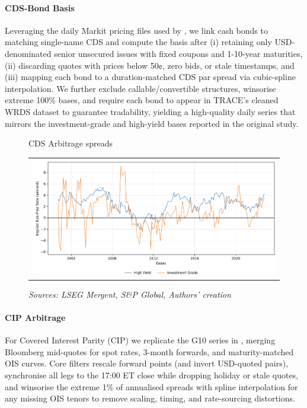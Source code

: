 \documentclass{article}
\begin{document}
\paragraph{CDS-Bond Basis}
Leveraging the daily Markit pricing files used by \citet{Siriwardane2021}, we link cash bonds to matching single-name CDS and compute the basis after (i) retaining only USD-denominated senior unsecured issues with fixed coupons and 1-10-year maturities, (ii) discarding quotes with prices below 50¢, zero bids, or stale timestamps, and (iii) mapping each bond to a duration-matched CDS par spread via cubic-spline interpolation.  We further exclude callable/convertible structures, winsorise extreme 100\% bases, and require each bond to appear in TRACE's cleaned WRDS dataset to guarantee tradability, yielding a high-quality daily series that mirrors the investment-grade and high-yield bases reported in the original study.


\begin{figure}[h!]
    \centering
    \caption{CDS Arbitrage spreads}
  \begin{tabular}{@{}c@{}}
    \includegraphics[width=.7\linewidth]{../docs_src/CDS_replicate.png}
  \end{tabular}
  \caption*{\emph{Sources: LSEG Mergent, S\&P Global, Authors' creation}}
  \label{fig:cds_basis}
\end{figure}

\paragraph{CIP Arbitrage}
For Covered Interest Parity (CIP) we replicate the G10 series in \citet{Du2018}, merging Bloomberg mid-quotes for spot rates, 3-month forwards, and maturity-matched OIS curves.  Core filters rescale forward points (and invert USD-quoted pairs), synchronise all legs to the 17:00 ET close while dropping holiday or stale quotes, and winsorise the extreme 1\% of annualised spreads with spline interpolation for any missing OIS tenors to remove scaling, timing, and rate-sourcing distortions.
\end{document}
